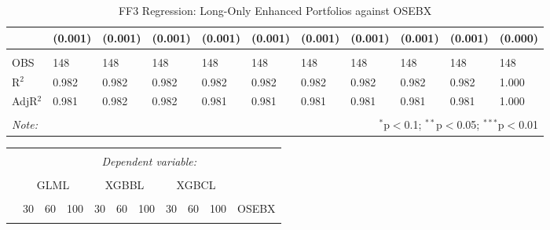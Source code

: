 \begin{appendices}
\begin{table}[H]
\begin{tabularx}{\textwidth}{XXXXXXXXXXl}
  & (0.001) & (0.001) & (0.001) & (0.001) & (0.001) & (0.001) & (0.001) & (0.001) & (0.001) & (0.000) \\ 
\hline \\[-1.8ex] 
OBS & 148 & 148 & 148 & 148 & 148 & 148 & 148 & 148 & 148 & 148 \\ 
R$^{2}$ & 0.982 & 0.982 & 0.982 & 0.982 & 0.982 & 0.982 & 0.982 & 0.982 & 0.982 & 1.000 \\ 
AdjR$^{2}$ & 0.981 & 0.982 & 0.982 & 0.981 & 0.981 & 0.981 & 0.981 & 0.981 & 0.981 & 1.000 \\ 

\hline 
\hline \\[-2ex] 
\textit{Note:}  & \multicolumn{10}{r}{$^{*}$p$<$0.1; $^{**}$p$<$0.05; $^{***}$p$<$0.01} \\ 
\end{tabularx}
\vspace{1em}
\caption{{FF3 Regression: Long-Only Enhanced Portfolios against OSEBX}} 
\label{FF3-long-only-enhanced-osebx} 
\end{table} 


\begin{table}[H] 
\centering 
\footnotesize
\begin{tabularx}{\textwidth}{XXXXXXXXXXl} 
\\[-2ex]\hline 
\hline \\[-2ex] 
 & \multicolumn{10}{c}{\textit{Dependent variable:}} \\ 
\cline{2-11} 
\\[-2ex] 
 & \multicolumn{3}{c}{GLML} & \multicolumn{3}{c}{XGBBL} & \multicolumn{3}{c}{XGBCL} & \\
 \cline{2-10}
 \\[-2ex] 
 & 30 & 60 & 100 & 30 & 60 & 100 & 30 & 60 & 100 & OSEBX \\ 
 \cline{2-10} \\


\end{tabularx}
\end{table}
\end{appendices}
